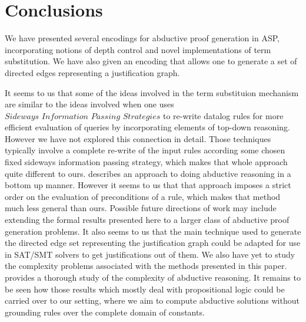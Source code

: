 \section{ Conclusions}\label{sec:conclusion}
We have presented several encodings for abductive proof generation in ASP,
incorporating notions of depth control and  novel implementations of term
substitution. We have also given an encoding that allows one to generate a set
of directed edges representing a justification graph.

It seems to us that some of the ideas involved in the term substituion
mechanism are similar to the ideas involved when one uses $\textit{Sideways
  Information Passing Strategies}$ \cite{beeri91} to re-write datalog rules
for more efficient evaluation of queries by incorporating elements of top-down
reasoning. However we have not explored this connection in detail. Those techniques 
typically involve a complete re-write of the input
rules according some chosen fixed sideways information passing strategy, which
makes that whole approach quite different to ours. \cite{DBLP:journals/jar/Stickel94} describes an approach 
to doing abductive reasoning in a bottom up manner. However it seems to us that
that approach 
imposes a strict order on the evaluation of preconditions of a rule, which makes 
that method much less general than ours. 
Possible future directions of work may include extending the formal results
presented here to a larger class of abductive proof generation problems. It
also seems to us that the main technique used to generate the directed edge
set representing the justification graph could be adapted for use in SAT/SMT
solvers to get justifications out of them. We also have yet to study the complexity problems
associated with the methods presented in this paper. \cite{DBLP:journals/tcs/EiterGL97} provides a thorough study 
of the complexity of abductive reasoning. It remains to be seen how those results 
which mostly deal with propositional logic could be carried over to our setting, where
we aim to compute abductive solutions without grounding rules over the complete 
domain of constants. %




